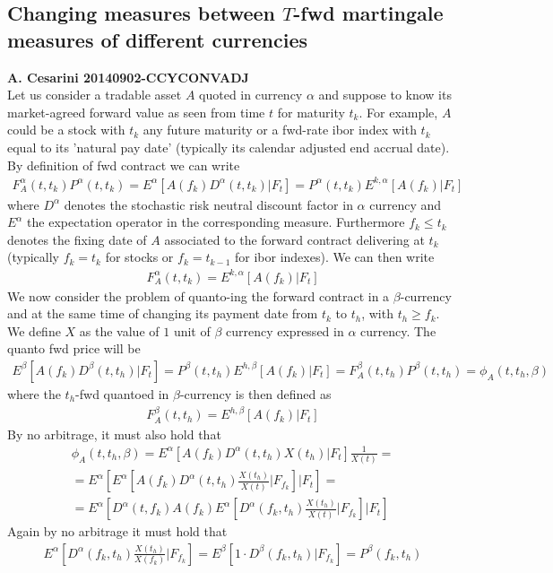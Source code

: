 \documentclass[12pt, a4paper]{article}
\newcommand\be{\begin{eqnarray}}
\newcommand\ee{\end{eqnarray}}
\begin{document}
\subsection{Changing measures between $T$-fwd martingale measures of different currencies}
{\bf{A. Cesarini 20140902-CCYCONVADJ}} \\
Let us consider a tradable asset $A$ quoted in currency $\alpha$ and suppose to know its market-agreed forward value as seen from time $t$ for maturity $t_k$. For example, $A$ could be a stock with $t_k$ any future maturity or a fwd-rate ibor index with $t_k$ equal to its 'natural pay date' (typically its calendar adjusted end accrual date). 
By definition of fwd contract we can write 
\be 
F_A^{\alpha}(t,t_k)P^{\alpha}(t,t_k) = E^{\alpha}\left[A(f_k) D^{\alpha}(t,t_k)| F_t\right]= P^{\alpha}(t,t_k) E^{k, \alpha}\left[A(f_k)| F_t\right]
\ee
where $D^{\alpha}$ denotes the stochastic risk neutral discount factor in $\alpha$ currency and $E^{\alpha}$ the expectation operator in the corresponding measure. 
Furthermore $f_k\le t_k$ denotes the fixing date of $A$ associated to the forward contract delivering at $t_k$ (typically $f_k=t_k$ for stocks or $f_k=t_{k-1}$ for ibor indexes). 
We can then write
\be 
F_A^{\alpha}(t,t_k) = E^{k, \alpha}\left[A(f_k)| F_t\right]
\ee
We now consider the problem of quanto-ing the forward contract in a $\beta$-currency and at the same time of changing its payment date from $t_k$ to $t_h$, with $t_h\ge f_k$. 
We define $X$ as the value of $1$ unit of $\beta$ currency expressed in $\alpha$ currency. The quanto fwd price will be
\be 
E^{\beta}\left[A(f_k) D^{\beta}(t,t_h)| F_t\right] =P^{\beta}(t,t_h) E^{h, \beta}\left[A(f_k)| F_t\right]=F_A^{\beta}(t,t_h)P^{\beta}(t,t_h)=\phi_A(t,t_h,\beta)
\label{eqa1}
\ee
where the $t_h$-fwd quantoed in $\beta$-currency is then defined as
\be 
F_A^{\beta}(t,t_h) = E^{h, \beta}\left[A(f_k)| F_t\right]
\ee
By no arbitrage, it must also hold that
\be 
\phi_A(t,t_h,\beta)=E^{\alpha}\left[A(f_k) D^{\alpha}(t,t_h) X(t_h) | F_t\right] \frac{1}{X(t)}=\\
= E^{\alpha}\left[E^{\alpha}\left[A(f_k) D^{\alpha}(t,t_h)\frac{X(t_h)}{X(t)} | F_{f_k}\right] | F_t\right] =\\
= E^{\alpha}\left[D^{\alpha}(t,f_k) A(f_k) E^{\alpha}\left[ D^{\alpha}(f_k,t_h)\frac{X(t_h)}{X(t)} | F_{f_k}\right] | F_t\right] 
\ee
Again by no arbitrage it must hold that
\be 
E^{\alpha}\left[ D^{\alpha}(f_k,t_h)\frac{X(t_h)}{X(f_k)} | F_{f_k}\right] =E^{\beta}\left[ 1 \cdot D^{\beta}(f_k,t_h) | F_{f_k}\right] = P^{\beta}(f_k,t_h)
\ee
\end{document}
